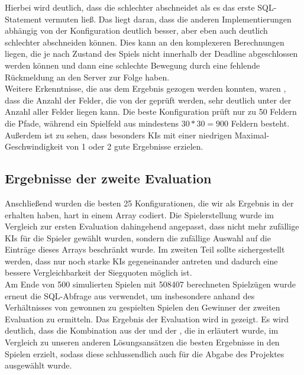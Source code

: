 Hierbei wird deutlich, dass die  schlechter abschneidet als es das erste SQL-Statement vermuten ließ.
Das liegt daran, dass die anderen Implementierungen abhängig von der Konfiguration deutlich besser, aber eben auch
deutlich schlechter abschneiden können.
Dies kann an den komplexeren Berechnungen liegen, die je nach Zustand des Spiels nicht innerhalb der Deadline
abgeschlossen werden können und dann eine schlechte Bewegung durch eine fehlende Rückmeldung an den Server zur Folge
haben. \\

Weitere Erkenntnisse, die aus dem Ergebnis gezogen werden konnten, waren \ua, dass die Anzahl der Felder, die von der
 geprüft werden, sehr deutlich unter der Anzahl aller Felder liegen kann.
Die beste Konfiguration prüft nur zu 50 Feldern die Pfade, während ein Spielfeld aus mindestens $30 * 30 = 900$ Feldern
besteht.
Außerdem ist zu sehen, dass besonders \ac{KI}s mit einer niedrigen Maximal-Geschwindigkeit von 1 oder 2 gute Ergebnisse
erzielen.

\subsection{Ergebnisse der zweite Evaluation}
\label{subsec:zweite-evaluation}

Anschließend wurden die besten 25 Konfigurationen, die wir als Ergebnis in der 
erhalten haben, hart in einem Array codiert.
Die Spielerstellung wurde im Vergleich zur ersten Evaluation dahingehend angepasst, dass nicht mehr zufällige \ac{KI}s
für die Spieler gewählt wurden, sondern die zufällige Auswahl auf die Einträge dieses Arrays beschränkt wurde.
Im zweiten Teil sollte sichergestellt werden, dass nur noch starke \ac{KI}s gegeneinander antreten und dadurch eine
bessere Vergleichbarkeit der Siegquoten möglich ist. \\

Am Ende von 500 simulierten Spielen mit 508407 berechneten Spielzügen wurde erneut die SQL-Abfrage aus
 verwendet, um insbesondere anhand des Verhältnisses von gewonnen zu gespielten Spielen
den Gewinner der zweiten Evaluation zu ermitteln.
Das Ergebnis der Evaluation wird in  gezeigt.
Es wird deutlich, dass die Kombination aus der  und der , die in
 erläutert wurde, im Vergleich zu unseren anderen Lösungsansätzen die besten
Ergebnisse in den Spielen erzielt, sodass diese schlussendlich auch für die Abgabe des Projektes ausgewählt wurde.

